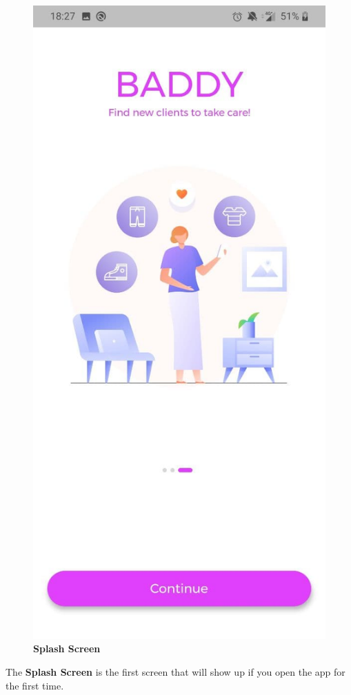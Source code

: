 \documentclass[../../dd.tex]{subfiles}
\begin{document}
\begin{figure}[H]
        \includegraphics[height=.4\textheight]{../../assets/screens/splash3.jpg}
        \caption{\textbf{Splash Screen}}\label{fig:figure}
    \end{figure}
    \begin{center}
        The \textbf{Splash Screen} is the first screen that will show up if you open the app for the first time.
    \end{center}
\end{document}
